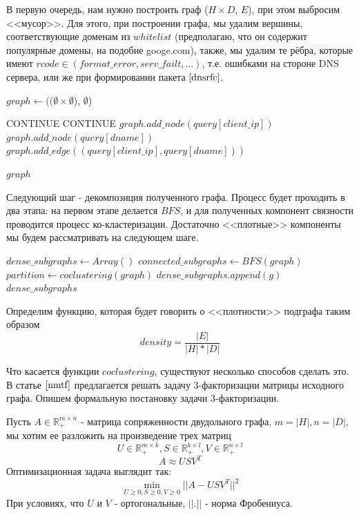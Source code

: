 \documentclass[a4paper,14pt]{extreport} %
\begin{document}
В первую очередь, нам нужно построить граф ($H \times D$, $E$), при этом выбросим <<мусор>>. Для этого, при построении графа, мы удалим вершины, соответствующие доменам из $whitelist$ (предполагаю, что он содержит популярные домены, на подобие googe.com), также, мы удалим те рёбра, которые имеют $rcode \in (format\_error, serv\_failt, ...)$, т.е. ошибками на стороне DNS сервера, или же при формировании пакета $\cite{dnsrfc}$.
\\
\begin{algorithmic}
	\State $graph \gets ((\emptyset \times \emptyset$), $\emptyset$)
		
	\State CONTINUE
	\EndIf
	\State CONTINUE
	\EndIf
	\State $graph.add\_node(query[client\_ip])$
	\State $graph.add\_node(query[dname])$
	\State $graph.add\_edge((query[client\_ip], query[dname]))$
				
	\EndFor
	\State \Return $graph$
	\EndFunction
\end{algorithmic}
	
	
Следующий шаг - декомпозиция полученного графа. Процесс будет проходить в два этапа: на первом этапе делается $BFS$, и для полученных компонент связности проводится процесс ко-кластеризации. Достаточно <<плотные>> компоненты мы будем рассматривать на следующем шаге.
\begin{algorithmic}
	\State $dense\_subgraphs\gets Array()$
	\State $connected\_subgraphs\gets BFS(graph)$
	\State $partition \gets coclustering(graph)$
	\State $dense\_subgraphs.append(g)$
	\EndIf
	\EndFor
	\EndFor
	\State \Return $dense\_subgraphs$
	\EndFunction
\end{algorithmic}
	
Определим функцию, которая будет говорить о <<плотности>> подграфа таким образом
$$density = \frac{|E|}{|H|*|D|}$$
	
Что касается функции $coclustering$, существуют несколько способов сделать это. В статье $\cite{nmtf}$ предлагается решать задачу 3-факторизации матрицы исходного графа. Опишем формальную постановку задачи 3-факторизации.
	
Пусть $A \in \mathbb{R}_{+}^{m \times n}$ - матрица сопряженности двудольного графа,  $m = |H|, n = |D|$, мы хотим ее разложить на произведение трех матриц $$ U \in \mathbb{R}_{+}^{m \times k}, S \in \mathbb{R}_{+}^{k \times l}, V \in  \mathbb{R}_{+}^{n \times l}$$
$$ A \approx USV^T$$
Оптимизационная задача выглядит так:
$$\min_{U \ge 0, S \ge 0, V \ge 0}{|| A - USV^T||^2}$$
При условиях, что  $U$ и $V$  - ортогональные, $||.||$ - норма Фробениуса.
	
\end{document}
